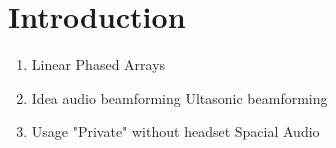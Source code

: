 \chapter{Introduction}

\begin{enumerate}
  \item Linear Phased Arrays
  \item Idea
  \subitem audio beamforming
  \subitem Ultasonic beamforming
  \item Usage
  \subitem "Private" without headset
  \subitem Spacial Audio
\end{enumerate}